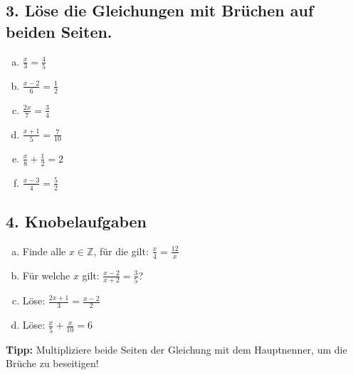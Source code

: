 \vspace{1em}

\subsection*{3. Löse die Gleichungen mit Brüchen auf beiden Seiten.}

\begin{enumerate}[a)]
    \item $\displaystyle \frac{x}{3} = \frac{4}{5}$
    \item $\displaystyle \frac{x-2}{6} = \frac{1}{2}$
    \item $\displaystyle \frac{2x}{7} = \frac{3}{4}$
    \item $\displaystyle \frac{x+1}{5} = \frac{7}{10}$
    \item $\displaystyle \frac{x}{8} + \frac{1}{2} = 2$
    \item $\displaystyle \frac{x-3}{4} = \frac{5}{2}$
\end{enumerate}

\vspace{1em}

\subsection*{4. Knobelaufgaben}

\begin{enumerate}[a)]
    \item Finde alle $x \in \mathbb{Z}$, für die gilt: $\displaystyle \frac{x}{4} = \frac{12}{x}$
    \item Für welche $x$ gilt: $\displaystyle \frac{x-2}{x+2} = \frac{3}{5}$?
    \item Löse: $\displaystyle \frac{2x+1}{3} = \frac{x-2}{2}$
    \item Löse: $\displaystyle \frac{x}{5} + \frac{x}{10} = 6$
\end{enumerate}

\vspace{1em}

\textbf{Tipp:} Multipliziere beide Seiten der Gleichung mit dem Hauptnenner, um die Brüche zu beseitigen!